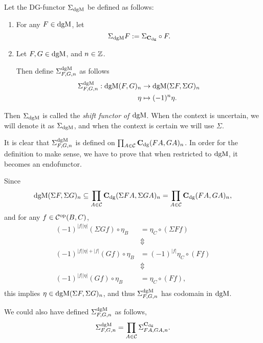 \begin{definition}
    \label{def:sigma_dgmod}
    Let the DG-functor \( \Sigma_{\operatorname{dgM}} \) be defined as follows:
    \begin{enumerate}
        \item {
            For any \( F \in \operatorname{dgM} \), let
            \[
                \Sigma_{\operatorname{dgM}} F := \Sigma_{\operatorname{\mathbf{C}}_{\operatorname{dg}}} \circ F.
            \]
        }
        \item {
            Let \( F, G \in \operatorname{dgM} \), and \( n \in {\mathbb{Z}} \).
            
            Then define \( \Sigma_{F, G, n}^{\operatorname{dgM}} \) as follows
            \begin{align*}
                \Sigma_{F, G, n}^{\operatorname{dgM}}: \operatorname{dgM}(F, G)_n &\to \operatorname{dgM}(\Sigma F, \Sigma G)_n \\
                \eta &\mapsto (-1)^n \eta.
            \end{align*}
        }
    \end{enumerate}
    Then \( \Sigma_{\operatorname{dgM}} \) is called the \emph{shift functor of \( \operatorname{dgM} \)}. When the context is uncertain, we will denote it as \( \Sigma_{\operatorname{dgM}} \), and when the context is certain we will use \( \Sigma \).
\end{definition}

It is clear that \( \Sigma_{F, G, n}^{\operatorname{dgM}} \) is defined on \( \prod_{A \in {\mathcal{C}}} \operatorname{\mathbf{C}}_{\operatorname{dg}}(F A, G A)_n \). In order for the definition to make sense, we have to prove that when restricted to \( \operatorname{dgM} \), it becomes an endofunctor.

Since
\[
    \operatorname{dgM}(\Sigma F, \Sigma G)_n \subseteq \prod_{A \in {\mathcal{C}}} \operatorname{\mathbf{C}}_{\operatorname{dg}}(\Sigma F A, \Sigma G A)_n = \prod_{A \in {\mathcal{C}}} \operatorname{\mathbf{C}}_{\operatorname{dg}}(F A, G A)_n,
\]
and for any \( f \in {\mathcal{C}}^{\operatorname{op}}(B, C) \),
\begin{align*}
    (-1)^{|f||\eta|}(\Sigma G f) \circ \eta_{B} &= \eta_{C} \circ (\Sigma F f) \\
    &\Updownarrow \\
    (-1)^{|f||\eta| + |f|} (G f) \circ \eta_{B} &= (-1)^{|f|} \eta_{C} \circ (F f) \\
    &\Updownarrow \\
    (-1)^{|f||\eta|}(G f) \circ \eta_{B} &= \eta_{C} \circ (F f), \\
\end{align*}
this implies \( \eta \in \operatorname{dgM}(\Sigma F, \Sigma G)_n \), and thus \( \Sigma_{F, G, n}^{\operatorname{dgM}} \) has codomain in \( \operatorname{dgM} \).

We could also have defined \( \Sigma_{F, G, n}^{\operatorname{dgM}} \) as follows,
\[
    \Sigma_{F, G, n}^{\operatorname{dgM}} = \prod_{A \in {\mathcal{C}}} \Sigma_{F A, G A, n}^{\operatorname{\mathbf{C}}_{\operatorname{dg}}}.
\] 

